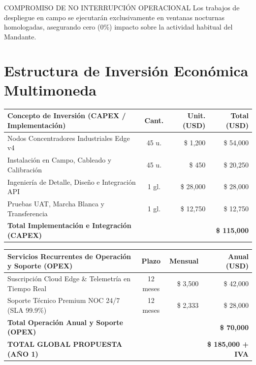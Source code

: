 \documentclass[11pt,letterpaper]{article}
\begin{document}
\vspace{0.6em}

\begin{corpdirective}{COMPROMISO DE NO INTERRUPCI\'ON OPERACIONAL}
  Los trabajos de despliegue en campo se ejecutar\'an exclusivamente en ventanas nocturnas homologadas, asegurando cero (0\%) impacto sobre la actividad habitual del Mandante.
\end{corpdirective}

\newpage

\section{Estructura de Inversi\'on Econ\'omica Multimoneda}

\begin{tabularx}{\linewidth}{@{}X c r r@{}}
  \toprule
  \textbf{\color{corpPrimary}Concepto de Inversi\'on (CAPEX / Implementaci\'on)} & \textbf{\color{corpPrimary}Cant.} & \textbf{\color{corpPrimary}Unit. (USD)} & \textbf{\color{corpPrimary}Total (USD)} \\
  \midrule
  Nodos Concentradores Industriales Edge v4 & 45 u. & \$ 1,200 & \$ 54,000 \\
  Instalaci\'on en Campo, Cableado y Calibraci\'on & 45 u. & \$ 450 & \$ 20,250 \\
  Ingenier\'ia de Detalle, Dise\~no e Integraci\'on API & 1 gl. & \$ 28,000 & \$ 28,000 \\
  Pruebas UAT, Marcha Blanca y Transferencia & 1 gl. & \$ 12,750 & \$ 12,750 \\
  \midrule
  \textbf{Total Implementaci\'on e Integraci\'on (CAPEX)} & & & \textbf{\$ 115,000} \\
  \bottomrule
\end{tabularx}

\vspace{0.4em}

\begin{tabularx}{\linewidth}{@{}X c r r@{}}
  \toprule
  \textbf{\color{corpPrimary}Servicios Recurrentes de Operaci\'on y Soporte (OPEX)} & \textbf{\color{corpPrimary}Plazo} & \textbf{\color{corpPrimary}Mensual} & \textbf{\color{corpPrimary}Anual (USD)} \\
  \midrule
  Suscripci\'on Cloud Edge \& Telemetr\'ia en Tiempo Real & 12 meses & \$ 3,500 & \$ 42,000 \\
  Soporte T\'ecnico Premium NOC 24/7 (SLA 99.9\%) & 12 meses & \$ 2,333 & \$ 28,000 \\
  \midrule
  \textbf{Total Operaci\'on Anual y Soporte (OPEX)} & & & \textbf{\$ 70,000} \\
  \midrule
  \textbf{\color{corpPrimary}TOTAL GLOBAL PROPUESTA (A\~NO 1)} & & & \textbf{\$ 185,000 + IVA} \\
  \bottomrule
\end{tabularx}
\end{document}
